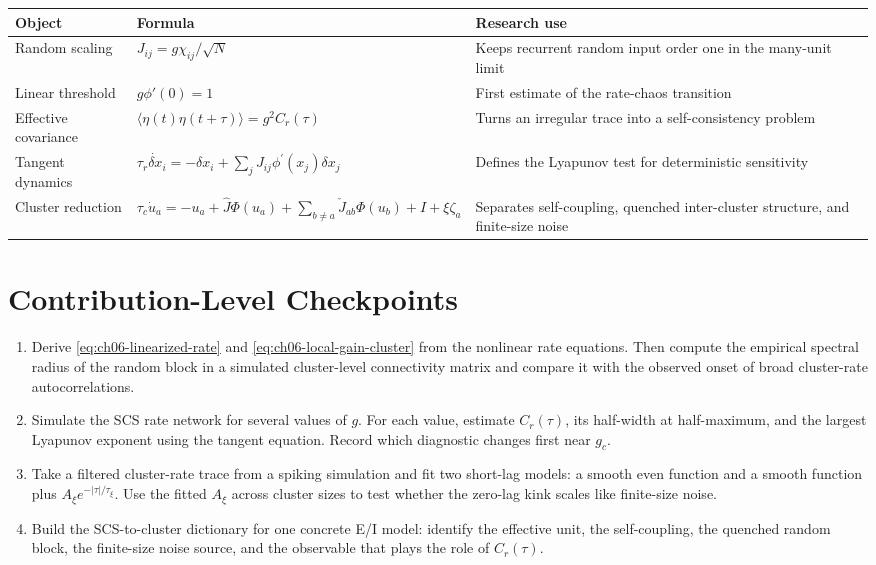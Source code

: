 \begin{chaptersummary}
\begin{center}
\renewcommand{\arraystretch}{1.35}
\begin{tabularx}{\textwidth}{@{}l X X@{}}
  \toprule
  \textbf{Object} & \textbf{Formula} & \textbf{Research use} \\
  \midrule
  Random scaling &
  \(J_{ij}=g\chi_{ij}/\sqrt{N}\) &
  Keeps recurrent random input order one in the many-unit limit \\
  Linear threshold &
  \(g\phi'(0)=1\) &
  First estimate of the rate-chaos transition \\
  Effective covariance &
  \(\langle \eta(t)\eta(t+\tau)\rangle=g^2C_r(\tau)\) &
  Turns an irregular trace into a self-consistency problem \\
  Tangent dynamics &
  \(\tau_r\dot{\delta x}_i=-\delta x_i+\sum_j J_{ij}\phi^{\prime}(x_j)\delta x_j\) &
  Defines the Lyapunov test for deterministic sensitivity \\
  Cluster reduction &
  \(\tau_c\dot u_a=-u_a+\widehat J\Phi(u_a)+\sum_{b\ne a}\check J_{ab}\Phi(u_b)+I+\xi\zeta_a\) &
  Separates self-coupling, quenched inter-cluster structure, and finite-size noise \\
  \bottomrule
\end{tabularx}
\end{center}
\end{chaptersummary}

\section{Contribution-Level Checkpoints}
\label{sec:ch06-contribution-checkpoints}

\begin{enumerate}
    \item Derive \cref{eq:ch06-linearized-rate} and
    \cref{eq:ch06-local-gain-cluster} from the nonlinear rate equations. Then
    compute the empirical spectral radius of the random block in a simulated
    cluster-level connectivity matrix and compare it with the observed onset of
    broad cluster-rate autocorrelations.

    \item Simulate the SCS rate network for several values of \(g\). For each
    value, estimate \(C_r(\tau)\), its half-width at half-maximum, and the
    largest Lyapunov exponent using the tangent equation. Record which
    diagnostic changes first near \(g_c\).

    \item Take a filtered cluster-rate trace from a spiking simulation and fit
    two short-lag models: a smooth even function and a smooth function plus
    \(A_\xi e^{-|\tau|/\tau_\xi}\). Use the fitted \(A_\xi\) across cluster
    sizes to test whether the zero-lag kink scales like finite-size noise.

    \item Build the SCS-to-cluster dictionary for one concrete E/I model:
    identify the effective unit, the self-coupling, the quenched random block,
    the finite-size noise source, and the observable that plays the role of
    \(C_r(\tau)\).
\end{enumerate}
